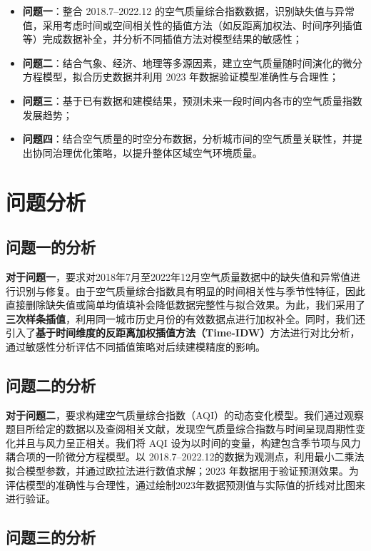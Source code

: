 \documentclass[a4paper,12pt]{article}
\begin{document}
	\begin{itemize}
		\item \textbf{问题一}：整合 2018.7–2022.12 的空气质量综合指数数据，识别缺失值与异常值，采用考虑时间或空间相关性的插值方法（如反距离加权法、时间序列插值等）完成数据补全，并分析不同插值方法对模型结果的敏感性；
		\item \textbf{问题二}：结合气象、经济、地理等多源因素，建立空气质量随时间演化的微分方程模型，拟合历史数据并利用 2023 年数据验证模型准确性与合理性；
		\item \textbf{问题三}：基于已有数据和建模结果，预测未来一段时间内各市的空气质量指数发展趋势；
		\item \textbf{问题四}：结合空气质量的时空分布数据，分析城市间的空气质量关联性，并提出协同治理优化策略，以提升整体区域空气环境质量。
	\end{itemize}
	
	\section{问题分析}  
	
	\subsection{问题一的分析}  
	\textbf{对于问题一}，要求对2018年7月至2022年12月空气质量数据中的缺失值和异常值进行识别与修复。由于空气质量综合指数具有明显的时间相关性与季节性特征，因此直接删除缺失值或简单均值填补会降低数据完整性与拟合效果。为此，我们采用了\textbf{三次样条插值}，利用同一城市历史月份的有效数据点进行加权补全。同时，我们还引入了\textbf{基于时间维度的反距离加权插值方法（Time-IDW）}方法进行对比分析，通过敏感性分析评估不同插值策略对后续建模精度的影响。
		
	\subsection{问题二的分析}
	
	\textbf{对于问题二}，要求构建空气质量综合指数（AQI）的动态变化模型。我们通过观察题目所给定的数据以及查阅相关文献\cite{ref2}，发现空气质量综合指数与时间呈现周期性变化并且与风力呈正相关。我们将 AQI 设为以时间的变量，构建包含季节项与风力耦合项的一阶微分方程模型。以 2018.7–2022.12的数据为观测点，利用最小二乘法拟合模型参数，并通过欧拉法进行数值求解；2023 年数据用于验证预测效果。为评估模型的准确性与合理性，通过绘制2023年数据预测值与实际值的折线对比图来进行验证。

	\subsection{问题三的分析}
	
\end{document}
